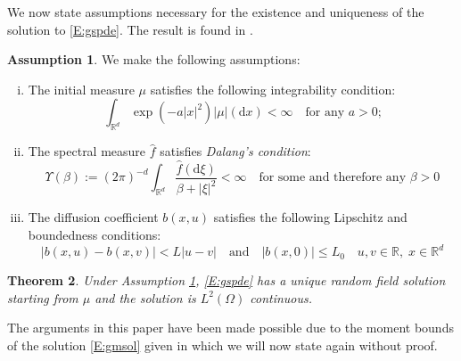 \documentclass[a4paper,11pt]{article}
\numberwithin{equation}{section}
\theoremstyle{plain}
\newtheorem{theorem}{Theorem}[section]
\theoremstyle{definition}
\newtheorem{assumptions}[theorem]{Assumption}
\newtheorem{notation}[theorem]{Notation}
\newcommand{\R}{\mathbb{R}}
\newcommand{\ud}{\ensuremath{\mathrm{d}}}
\begin{document}
We now state assumptions necessary for the existence and uniqueness of the solution to \eqref{E:gspde}. The result is
found in \cite{CK15SHE,CH16Comparison}.

\begin{assumptions} 
	\label{A:General}
	We make the following assumptions:
	\begin{enumerate}[(i)]
		\item The initial measure $\mu$ satisfies the following integrability condition: 
			\begin{equation}
				\int_{\R^d}\exp\left(-a|x|^2\right)|\mu|(\ud x) < \infty \quad \text{for any $a>0$;} \label{A:icon} 
			\end{equation}
		\item The spectral measure $\hat{f}$ satisfies {\it Dalang's condition}:
			\begin{equation}
				\Upsilon(\beta) := (2\pi)^{-d}\int_{\R^d}\dfrac{\hat f(\ud \xi)}{\beta + |\xi|^2} <
				\infty \quad \text{for some and therefore any $\beta>0$}  \label{A:dalcon} 
			\end{equation}
		\item The diffusion coefficient $b(x,u)$ satisfies the following Lipschitz and boundedness conditions: 
			\begin{equation}  
				|b(x,u)-b(x,v)|< L |u-v| \quad \text{and} \quad |b(x,0)| \le L_0 \quad u,v \in \R, \; x \in \R^d \label{A:lipcon} 
			\end{equation}
	\end{enumerate}
\end{assumptions}



\begin{theorem}
Under Assumption \ref{A:General}, \eqref{E:gspde} has a unique random field solution starting from $\mu$ and the solution is $L^2(\Omega)$ continuous. 
\end{theorem}

The arguments in this paper have been made possible due to the moment bounds of the solution \eqref{E:gmsol} given in \cite{CH16Comparison} which we will now state again without proof.
\end{document}

